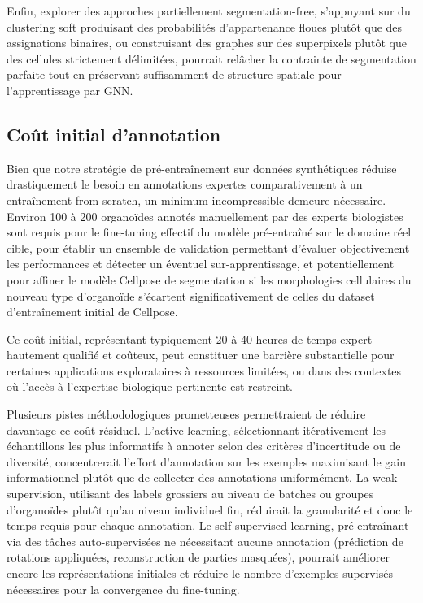 Enfin, explorer des approches partiellement segmentation-free, s'appuyant sur du clustering soft produisant des probabilités d'appartenance floues plutôt que des assignations binaires, ou construisant des graphes sur des superpixels plutôt que des cellules strictement délimitées, pourrait relâcher la contrainte de segmentation parfaite tout en préservant suffisamment de structure spatiale pour l'apprentissage par GNN.

\subsection{Coût initial d'annotation}

Bien que notre stratégie de pré-entraînement sur données synthétiques réduise drastiquement le besoin en annotations expertes comparativement à un entraînement from scratch, un minimum incompressible demeure nécessaire. Environ 100 à 200 organoïdes annotés manuellement par des experts biologistes sont requis pour le fine-tuning effectif du modèle pré-entraîné sur le domaine réel cible, pour établir un ensemble de validation permettant d'évaluer objectivement les performances et détecter un éventuel sur-apprentissage, et potentiellement pour affiner le modèle Cellpose de segmentation si les morphologies cellulaires du nouveau type d'organoïde s'écartent significativement de celles du dataset d'entraînement initial de Cellpose. 

Ce coût initial, représentant typiquement 20 à 40 heures de temps expert hautement qualifié et coûteux, peut constituer une barrière substantielle pour certaines applications exploratoires à ressources limitées, ou dans des contextes où l'accès à l'expertise biologique pertinente est restreint.

Plusieurs pistes méthodologiques prometteuses permettraient de réduire davantage ce coût résiduel. L'active learning, sélectionnant itérativement les échantillons les plus informatifs à annoter selon des critères d'incertitude ou de diversité, concentrerait l'effort d'annotation sur les exemples maximisant le gain informationnel plutôt que de collecter des annotations uniformément. La weak supervision, utilisant des labels grossiers au niveau de batches ou groupes d'organoïdes plutôt qu'au niveau individuel fin, réduirait la granularité et donc le temps requis pour chaque annotation. Le self-supervised learning, pré-entraînant via des tâches auto-supervisées ne nécessitant aucune annotation (prédiction de rotations appliquées, reconstruction de parties masquées), pourrait améliorer encore les représentations initiales et réduire le nombre d'exemples supervisés nécessaires pour la convergence du fine-tuning.

